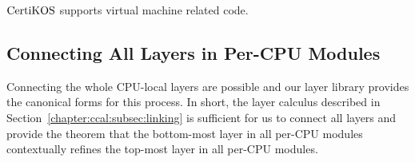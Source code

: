 $\mathrm{CertiKOS}$ supports virtual machine related code. 

\subsection{Connecting All Layers in Per-CPU Modules}
\label{chapter:certikos:subsec:per-cpu-layers-connect}


Connecting the whole CPU-local layers are possible and 
our layer library provides the canonical forms for this process. 
In short, the layer calculus described in Section~\ref{chapter:ccal:subsec:linking} is sufficient for us to 
connect all layers and provide the theorem that 
the bottom-most layer in all per-CPU modules contextually refines the top-most layer in all per-CPU modules.
